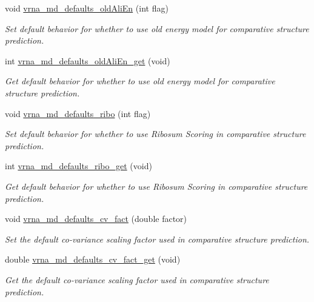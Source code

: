 \begin{DoxyCompactItemize}
void \mbox{\hyperlink{group__model__details_ga41521d5b9fb7e0f31e7ea73f5792afab}{vrna\+\_\+md\+\_\+defaults\+\_\+old\+Ali\+En}} (int flag)
\begin{DoxyCompactList}\small\item\em Set default behavior for whether to use old energy model for comparative structure prediction. \end{DoxyCompactList}\item 
int \mbox{\hyperlink{group__model__details_ga2374492b5019df88022fe4c05f0f3630}{vrna\+\_\+md\+\_\+defaults\+\_\+old\+Ali\+En\+\_\+get}} (void)
\begin{DoxyCompactList}\small\item\em Get default behavior for whether to use old energy model for comparative structure prediction. \end{DoxyCompactList}\item 
void \mbox{\hyperlink{group__model__details_ga937c45e1d06fd6168730a9b08d130be3}{vrna\+\_\+md\+\_\+defaults\+\_\+ribo}} (int flag)
\begin{DoxyCompactList}\small\item\em Set default behavior for whether to use Ribosum Scoring in comparative structure prediction. \end{DoxyCompactList}\item 
int \mbox{\hyperlink{group__model__details_ga169027f0c0561ea7d87b655e4b336bfc}{vrna\+\_\+md\+\_\+defaults\+\_\+ribo\+\_\+get}} (void)
\begin{DoxyCompactList}\small\item\em Get default behavior for whether to use Ribosum Scoring in comparative structure prediction. \end{DoxyCompactList}\item 
void \mbox{\hyperlink{group__model__details_gad3a3f40baafd91a6ce80a91a68e20053}{vrna\+\_\+md\+\_\+defaults\+\_\+cv\+\_\+fact}} (double factor)
\begin{DoxyCompactList}\small\item\em Set the default co-\/variance scaling factor used in comparative structure prediction. \end{DoxyCompactList}\item 
double \mbox{\hyperlink{group__model__details_gae59c68393807217b0a2497adb64d3ee3}{vrna\+\_\+md\+\_\+defaults\+\_\+cv\+\_\+fact\+\_\+get}} (void)
\begin{DoxyCompactList}\small\item\em Get the default co-\/variance scaling factor used in comparative structure prediction. \end{DoxyCompactList}\item 

\end{DoxyCompactItemize}
